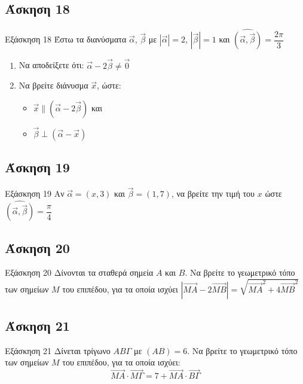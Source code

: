 \documentclass[greek]{beamer}
\begin{document}
\subsection{Άσκηση 18}
\begin{frame}[label=Άσκηση18,t]{Εξάσκηση 18}
      Έστω τα διανύσματα $\vec{α}$, $\vec{β}$ με $|\vec{α}|=2$, $|\vec{β}|=1$ και $\widehat{(\vec{α }, \vec{β })}=\dfrac{2\pi}{3}$
      \begin{enumerate}
            \item<1-> Να αποδείξετε ότι: $\vec{α}-2\vec{β}\ne \vec{0}$
            \item<2-> Να βρείτε διάνυσμα $\vec{x}$, ώστε:
                  \begin{itemize}
                        \item $\vec{x}\parallel (\vec{α}-2\vec{β})$ και
                        \item $\vec{β}\perp (\vec{α}-\vec{x})$
                  \end{itemize}
      \end{enumerate}
\end{frame}

\subsection{Άσκηση 19}
\begin{frame}[label=Άσκηση19,t]{Εξάσκηση 19}
      Αν $\vec{α}=(x,3)$ και $\vec{β}=(1,7)$, να βρείτε την τιμή του $x$ ώστε $\widehat{(\vec{α }, \vec{β })}=\dfrac{\pi}{4}$
\end{frame}

\subsection{Άσκηση 20}
\begin{frame}[label=Άσκηση20,t]{Εξάσκηση 20}
      Δίνονται τα σταθερά σημεία $Α$ και $Β$. Να βρείτε το γεωμετρικό τόπο των σημείων $Μ$ του επιπέδου, για τα οποία ισχύει $|\overrightarrow{ΜΑ}-2\overrightarrow{ΜΒ}|=\sqrt{\overrightarrow{ΜΑ}^2+4\overrightarrow{ΜΒ}^2}$
\end{frame}

\subsection{Άσκηση 21}
\begin{frame}[label=Άσκηση21,t]{Εξάσκηση 21}
      Δίνεται τρίγωνο $ΑΒΓ$ με $(ΑΒ)=6$. Να βρείτε το γεωμετρικό τόπο των σημείων $Μ$ του επιπέδου, για τα οποία ισχύει:
      $$\overrightarrow{ΜΑ}\cdot \overrightarrow{ΜΓ}=7+\overrightarrow{ΜΑ}\cdot \overrightarrow{ΒΓ}$$
\end{frame}
\end{document}
